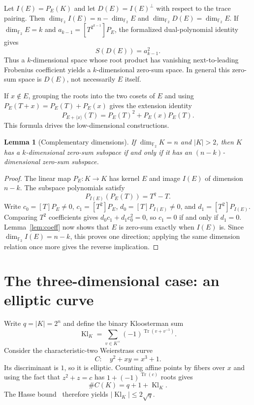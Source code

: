 \documentclass[11pt]{amsart}
\numberwithin{equation}{section}
\newtheorem{lemma}[theorem]{Lemma}
\theoremstyle{definition}
\theoremstyle{remark}
\newcommand{\Ftwo}{\mathbb F_2}
\newcommand{\tr}{\operatorname{Tr}}
\newcommand{\dimf}{\dim_{\Ftwo}}
\begin{document}
Let $I(E)=P_E(K)$ and let $D(E)=I(E)^\perp$ with respect to the trace pairing. Then $\dimf I(E)=n-\dimf E$ and $\dimf D(E)=\dimf E$. If $\dimf E=k$ and $a_{k-1}=[T^{2^{k-1}}]P_E$, the formalized dual-polynomial identity gives
\begin{equation}\label{eq:duality}
 S(D(E))=a_{k-1}^{2}.
\end{equation}
Thus a $k$-dimensional space whose root product has vanishing next-to-leading Frobenius coefficient yields a $k$-dimensional zero-sum space. In general this zero-sum space is $D(E)$, not necessarily $E$ itself.

If $x\notin E$, grouping the roots into the two cosets of $E$ and using $P_E(T+x)=P_E(T)+P_E(x)$ gives the extension identity
\begin{equation}\label{eq:extension}
 P_{E+\langle x\rangle}(T)=P_E(T)^2+P_E(x)P_E(T).
\end{equation}
This formula drives the low-dimensional constructions.

\begin{lemma}[Complementary dimensions]\label{lem:complement}
If $\dimf K=n$ and $|K|>2$, then $K$ has a $k$-dimensional zero-sum subspace if and only if it has an $(n-k)$-dimensional zero-sum subspace.
\end{lemma}
\begin{proof}
The linear map $P_E:K\to K$ has kernel $E$ and image $I(E)$ of dimension $n-k$. The subspace polynomials satisfy
\[
 P_{I(E)}(P_E(T))=T^q-T.
\]
Write $c_0=[T]P_E\ne0$, $c_1=[T^2]P_E$, $d_0=[T]P_{I(E)}\ne0$, and $d_1=[T^2]P_{I(E)}$. Comparing $T^2$ coefficients gives $d_0c_1+d_1c_0^2=0$, so $c_1=0$ if and only if $d_1=0$. Lemma~\ref{lem:coeff} now shows that $E$ is zero-sum exactly when $I(E)$ is. Since $\dimf I(E)=n-k$, this proves one direction; applying the same dimension relation once more gives the reverse implication.
\end{proof}

\section{The three-dimensional case: an elliptic curve}

Write $q=|K|=2^n$ and define the binary Kloosterman sum
\[
 \operatorname{Kl}_K=\sum_{v\in K^\times}(-1)^{\tr(v+v^{-1})}.
\]
Consider the characteristic-two Weierstrass curve
\[
 C:\quad y^2+xy=x^3+1.
\]
Its discriminant is $1$, so it is elliptic. Counting affine points by fibers over $x$ and using the fact that $z^2+z=c$ has $1+(-1)^{\tr(c)}$ roots gives
\[
 \#C(K)=q+1+\operatorname{Kl}_K.
\]
The Hasse bound~\cite{Silverman} therefore yields $|\operatorname{Kl}_K|\le2\sqrt q$.
\end{document}

